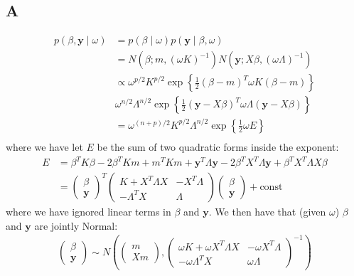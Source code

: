 \documentclass{article}
\begin{document}
\subsection*{A}
\begin{align*}
p(\beta, \mathbf{y} \mid \omega) &= p(\beta \mid \omega) p(\mathbf{y} \mid \beta, \omega)\\
&= N(\beta; m, (\omega K)^{-1}) N(\mathbf{y}; X\beta, (\omega\Lambda)^{-1})\\
&\propto \omega^{p/2} K^{p/2} \exp \left\lbrace\frac{1}{2}(\beta - m)^T\omega K (\beta - m) \right\rbrace \\
&  \omega^{n/2} \Lambda^{n/2} \exp \left\lbrace\frac{1}{2}(\mathbf{y} - X\beta)^T\omega \Lambda (\mathbf{y} - X\beta) \right\rbrace \\
&= \omega^{(n+p)/2} K^{p/2} \Lambda^{n/2} \exp \left\lbrace \frac{1}{2}\omega E  \right\rbrace \\
\end{align*}
where we have let \(E\) be the sum of two quadratic forms inside the exponent:
\begin{align*}
E &= \beta^T K \beta  - 2 \beta^T K m + m^T K m + \mathbf{y}^T \Lambda \mathbf{y} - 2 \beta^T X^T \Lambda \mathbf{y}  + \beta^T X^T \Lambda X \beta\\
&= \begin{pmatrix}
\beta \\ \mathbf{y}
\end{pmatrix}^T
\begin{pmatrix}
K + X^T\Lambda X & -X^T\Lambda\\
-\Lambda^T X & \Lambda
\end{pmatrix}
\begin{pmatrix}
\beta \\ \mathbf{y}
\end{pmatrix}
+ \mathrm{const}
\end{align*}
where we have ignored linear terms in \(\beta\) and \(\mathbf{y}\). We then have that (given \(\omega\)) \(\beta\) and \(\mathbf{y}\) are jointly Normal:
\begin{align*}
\begin{pmatrix}
\beta \\ \mathbf{y}
\end{pmatrix} \sim N\left( \begin{pmatrix}
m \\ Xm
\end{pmatrix}, \begin{pmatrix}
\omega K + \omega X^T\Lambda X & - \omega X^T\Lambda\\
-\omega \Lambda^T X & \omega \Lambda
\end{pmatrix}^{-1} \right)
\end{align*}
\end{document}

